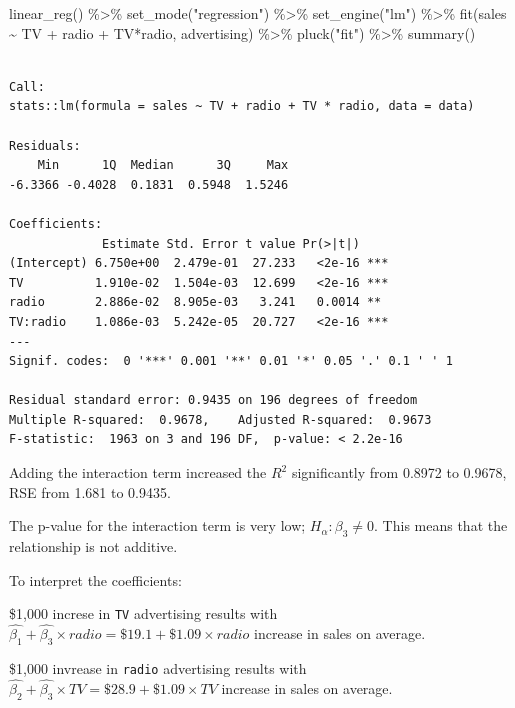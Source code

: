 \documentclass[
  letterpaper,
  DIV=11,
  numbers=noendperiod]{scrreprt}
\newenvironment{Shaded}{\begin{snugshade}}{\end{snugshade}}
\newcommand{\FunctionTok}[1]{\textcolor[rgb]{0.02,0.16,0.49}{#1}}
\newcommand{\NormalTok}[1]{\textcolor[rgb]{0.33,0.33,0.33}{#1}}
\newcommand{\SpecialCharTok}[1]{\textcolor[rgb]{0.00,0.46,0.62}{#1}}
\newcommand{\StringTok}[1]{\textcolor[rgb]{0.00,0.50,0.00}{#1}}
\begin{document}
\begin{Shaded}
\begin{Highlighting}[]
\FunctionTok{linear\_reg}\NormalTok{() }\SpecialCharTok{\%\textgreater{}\%} 
  \FunctionTok{set\_mode}\NormalTok{(}\StringTok{"regression"}\NormalTok{) }\SpecialCharTok{\%\textgreater{}\%} 
  \FunctionTok{set\_engine}\NormalTok{(}\StringTok{"lm"}\NormalTok{) }\SpecialCharTok{\%\textgreater{}\%} 
  \FunctionTok{fit}\NormalTok{(sales }\SpecialCharTok{\textasciitilde{}}\NormalTok{ TV }\SpecialCharTok{+}\NormalTok{ radio }\SpecialCharTok{+}\NormalTok{ TV}\SpecialCharTok{*}\NormalTok{radio, advertising) }\SpecialCharTok{\%\textgreater{}\%} 
  \FunctionTok{pluck}\NormalTok{(}\StringTok{"fit"}\NormalTok{) }\SpecialCharTok{\%\textgreater{}\%} 
  \FunctionTok{summary}\NormalTok{()}
\end{Highlighting}
\end{Shaded}

\begin{verbatim}

Call:
stats::lm(formula = sales ~ TV + radio + TV * radio, data = data)

Residuals:
    Min      1Q  Median      3Q     Max 
-6.3366 -0.4028  0.1831  0.5948  1.5246 

Coefficients:
             Estimate Std. Error t value Pr(>|t|)    
(Intercept) 6.750e+00  2.479e-01  27.233   <2e-16 ***
TV          1.910e-02  1.504e-03  12.699   <2e-16 ***
radio       2.886e-02  8.905e-03   3.241   0.0014 ** 
TV:radio    1.086e-03  5.242e-05  20.727   <2e-16 ***
---
Signif. codes:  0 '***' 0.001 '**' 0.01 '*' 0.05 '.' 0.1 ' ' 1

Residual standard error: 0.9435 on 196 degrees of freedom
Multiple R-squared:  0.9678,    Adjusted R-squared:  0.9673 
F-statistic:  1963 on 3 and 196 DF,  p-value: < 2.2e-16
\end{verbatim}

Adding the interaction term increased the \(R^2\) significantly from
0.8972 to 0.9678, RSE from 1.681 to 0.9435.

The p-value for the interaction term is very low;
\(H_\alpha : \beta_3 \neq 0\). This means that the relationship is not
additive.

To interpret the coefficients:

\$1,000 increse in \texttt{TV} advertising results with
\(\hat{\beta_1} +\hat{\beta_3}\times radio = \$19.1 + \$1.09 \times radio\)
increase in sales on average.

\$1,000 invrease in \texttt{radio} advertising results with
\(\hat{\beta_2} + \hat{\beta_3} \times TV = \$28.9 + \$1.09 \times TV\)
increase in sales on average.
\end{document}
